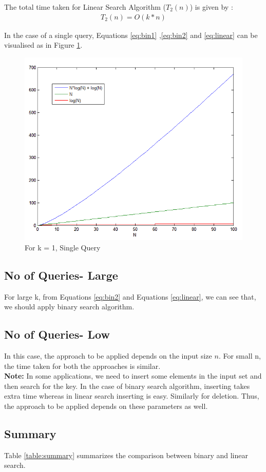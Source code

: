 \documentclass{article}
\begin{document}
The total time taken for Linear Search Algorithm ($T_2(n)$) is given by :
\begin{align}
T_2(n) = O(k*n)
\label{eq:linear}
\end{align}

In the case of a single query, Equations \ref{eq:bin1} ,\ref{eq:bin2} and \ref{eq:linear} can be visualised as in Figure \ref{fig:time}.
\begin{figure}[h!]
\begin{center}
\includegraphics[width=0.47\columnwidth]{time.png}
\caption{ For k = 1, Single Query  }
\label{fig:time}
\end{center}
\end{figure}

\subsection{No of Queries- Large}
For large k, from Equations \ref{eq:bin2} and Equations \ref{eq:linear}, we can see that, we should apply binary search algorithm.
\subsection{No of Queries- Low}
In this case, the approach to be applied depends on the input size $n$. For small n, the time taken for both the approaches is similar.\\

\textbf{Note: }In some applications, we need to insert some elements in the input set and then search for the key. In the case of binary search algorithm, inserting takes extra time whereas in linear search inserting is easy.
Similarly for deletion. Thus, the approach to be applied depends on these parameters as well.

\subsection{Summary}
Table \ref{table:summary} summarizes the comparison between binary and linear search.
\end{document}
